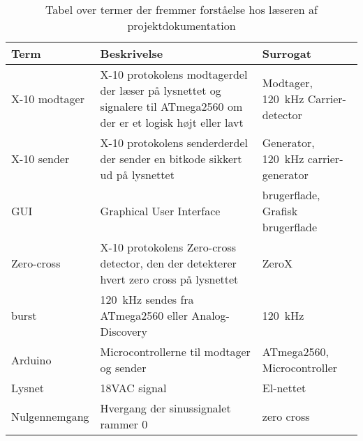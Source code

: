 \documentclass[11pt]{article}
\begin{document}
	\begin{table}[ht]
		\centering
		\label{tabel:TermListe}

			\begin{tabularx}{\textwidth}{l|X|X}

				\toprule \textbf{Term} 	& \textbf{Beskrivelse} & \textbf{Surrogat}\\

				\midrule X-10 modtager 	& X-10 protokolens modtagerdel der læser på lysnettet og signalere til ATmega2560 om der er et logisk højt eller lavt & Modtager, \SI{120}{\kilo\hertz} Carrier-detector \\

				\midrule X-10 sender 	& X-10 protokolens senderderdel der sender en bitkode sikkert ud på lysnettet & Generator, \SI{120}{\kilo\hertz} carrier-generator \\

				\midrule GUI 			& Graphical User Interface & brugerflade, Grafisk brugerflade  \\

				\midrule Zero-cross 	& X-10 protokolens Zero-cross detector, den der detekterer hvert zero cross på lysnettet & ZeroX\\

				\midrule burst			& \SI{120}{\kilo\hertz} sendes fra ATmega2560 eller Analog-Discovery & \SI{120}{\kilo\hertz} \\

				\midrule Arduino 		& Microcontrollerne til modtager og sender & ATmega2560, Microcontroller  \\

				\midrule Lysnet 		& 18VAC signal & El-nettet \\

				\midrule Nulgennemgang	& Hvergang der sinussignalet rammer 0 & zero cross \\
				\bottomrule
				
			\end{tabularx}
		\caption{Tabel over termer der fremmer forståelse hos læseren af projektdokumentation}
	\end{table}
\end{document}
